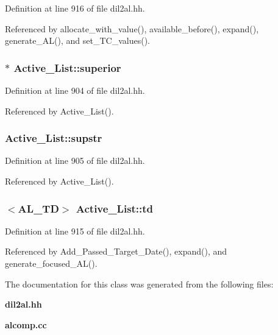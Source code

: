 Definition at line 916 of file dil2al.hh.

Referenced by allocate\_\-with\_\-value(), available\_\-before(), expand(), generate\_\-AL(), and set\_\-TC\_\-values().
\subsubsection{$\ast$ Active\_\-List::superior\hspace{0.3cm}{\tt  [protected]}}\label{classActive__List_n0}




Definition at line 904 of file dil2al.hh.

Referenced by Active\_\-List().
\subsubsection{ Active\_\-List::supstr\hspace{0.3cm}{\tt  [protected]}}\label{classActive__List_n1}




Definition at line 905 of file dil2al.hh.

Referenced by Active\_\-List().
\subsubsection{$<${\bf AL\_\-TD}$>$ Active\_\-List::td}\label{classActive__List_m1}




Definition at line 915 of file dil2al.hh.

Referenced by Add\_\-Passed\_\-Target\_\-Date(), expand(), and generate\_\-focused\_\-AL().

The documentation for this class was generated from the following files:\begin{CompactItemize}
\item 
{\bf dil2al.hh}\item 
{\bf alcomp.cc}\end{CompactItemize}
